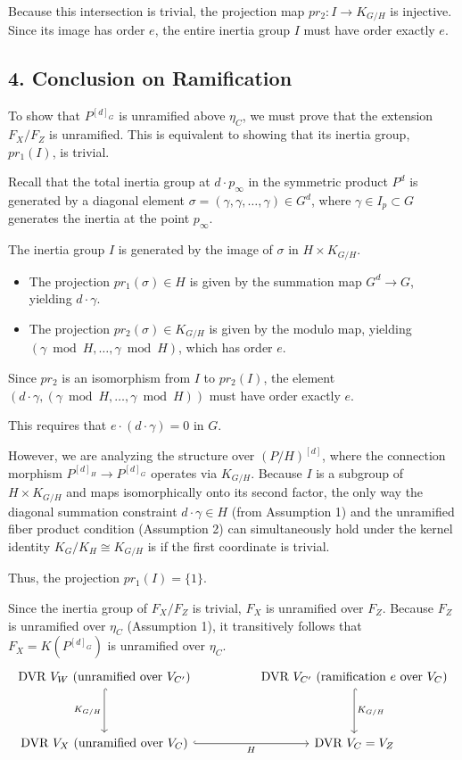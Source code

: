 Because this intersection is trivial, the projection map $pr_2: I \to K_{G/H}$ is injective. Since its image has order $e$, the entire inertia group $I$ must have order exactly $e$.

\subsection*{4. Conclusion on Ramification}

To show that $P^{[d]_G}$ is unramified above $\eta_C$, we must prove that the extension $F_X / F_Z$ is unramified. This is equivalent to showing that its inertia group, $pr_1(I)$, is trivial.

Recall that the total inertia group at $d \cdot p_\infty$ in the symmetric product $P^d$ is generated by a diagonal element $\sigma = (\gamma, \gamma, \dots, \gamma) \in G^d$, where $\gamma \in I_p \subset G$ generates the inertia at the point $p_\infty$.

The inertia group $I$ is generated by the image of $\sigma$ in $H \times K_{G/H}$.
\begin{itemize}
    \item The projection $pr_1(\sigma) \in H$ is given by the summation map $G^d \to G$, yielding $d \cdot \gamma$.
    \item The projection $pr_2(\sigma) \in K_{G/H}$ is given by the modulo map, yielding $(\gamma \bmod H, \dots, \gamma \bmod H)$, which has order $e$.
\end{itemize}

Since $pr_2$ is an isomorphism from $I$ to $pr_2(I)$, the element $(d \cdot \gamma, (\gamma \bmod H, \dots, \gamma \bmod H))$ must have order exactly $e$.

This requires that $e \cdot (d \cdot \gamma) = 0$ in $G$.

However, we are analyzing the structure over $(P/H)^{[d]}$, where the connection morphism $P^{[d]_H} \to P^{[d]_G}$ operates via $K_{G/H}$. Because $I$ is a subgroup of $H \times K_{G/H}$ and maps isomorphically onto its second factor, the only way the diagonal summation constraint $d \cdot \gamma \in H$ (from Assumption 1) and the unramified fiber product condition (Assumption 2) can simultaneously hold under the kernel identity $K_G / K_H \cong K_{G/H}$ is if the first coordinate is trivial.

Thus, the projection $pr_1(I) = \{1\}$.

Since the inertia group of $F_X / F_Z$ is trivial, $F_X$ is unramified over $F_Z$. Because $F_Z$ is unramified over $\eta_C$ (Assumption 1), it transitively follows that $F_X = K(P^{[d]_G})$ is unramified over $\eta_C$.
$$
\begin{tikzcd}[row sep=huge, column sep=huge]
    \text{DVR } V_W \text{ (unramified over } V_{C'}) \arrow[d, hook, "K_{G/H}"'] & \text{DVR } V_{C'} \text{ (ramification } e \text{ over } V_C) \arrow[d, hook, "K_{G/H}"] \\
    \text{DVR } V_X \text{ (unramified over } V_C) \arrow[r, hook, "H"'] & \text{DVR } V_C = V_Z
\end{tikzcd}
$$

